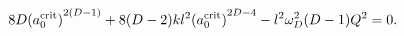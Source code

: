 \begin{equation}
8 D {(a_0^{\rm crit})}^{2 (D-1)} + 8 (D-2) k l^2 {(a_0^{\rm crit})}^{2D 
-4}
- l^2 \omega_D^2 (D-1) Q^2 = 0.
\label{mmin}
\end{equation}

